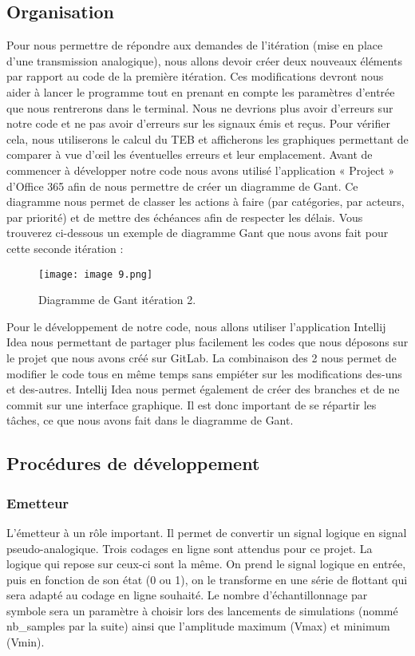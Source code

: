 \subsection{Organisation}

Pour nous permettre de répondre aux demandes de l’itération (mise en place d’une transmission analogique), nous allons devoir créer deux nouveaux éléments par rapport au code de la première itération. Ces modifications devront nous aider à lancer le programme tout en prenant en compte les paramètres d’entrée que nous rentrerons dans le terminal.
Nous ne devrions plus avoir d’erreurs sur notre code et ne pas avoir d’erreurs sur les signaux émis et reçus. Pour vérifier cela, nous utiliserons le calcul du TEB et afficherons les graphiques permettant de comparer à vue d’œil les éventuelles erreurs et leur emplacement.
Avant de commencer à développer notre code nous avons utilisé l’application « Project » d’Office 365 afin de nous permettre de créer un diagramme de Gant. Ce diagramme nous permet de classer les actions à faire (par catégories, par acteurs, par priorité) et de mettre des échéances afin de respecter les délais. Vous trouverez ci-dessous un exemple de diagramme Gant que nous avons fait pour cette seconde itération :

\begin{figure}[h]
    \centering
    \texttt{[image: image 9.png]}
    \caption{\label{fig:image9}Diagramme de Gant itération 2.}
\end{figure}

Pour le développement de notre code, nous allons utiliser l’application Intellij Idea nous permettant de partager plus facilement les codes que nous déposons sur le projet que nous avons créé sur GitLab. La combinaison des 2 nous permet de modifier le code tous en même temps sans empiéter sur les modifications des-uns et des-autres. Intellij Idea nous permet également de créer des branches et de ne commit sur une interface graphique. Il est donc important de se répartir les tâches, ce que nous avons fait dans le diagramme de Gant.

\subsection{Procédures de développement}
\subsubsection{Emetteur}

L’émetteur à un rôle important. Il permet de convertir un signal logique en signal pseudo-analogique. Trois codages en ligne sont attendus pour ce projet. La logique qui repose sur ceux-ci sont la même. On prend le signal logique en entrée, puis en fonction de son état (0 ou 1), on le transforme en une série de flottant qui sera adapté au codage en ligne souhaité. Le nombre d’échantillonnage par symbole sera un paramètre à choisir lors des lancements de simulations (nommé nb\_samples par la suite) ainsi que l’amplitude maximum (Vmax) et minimum (Vmin).

